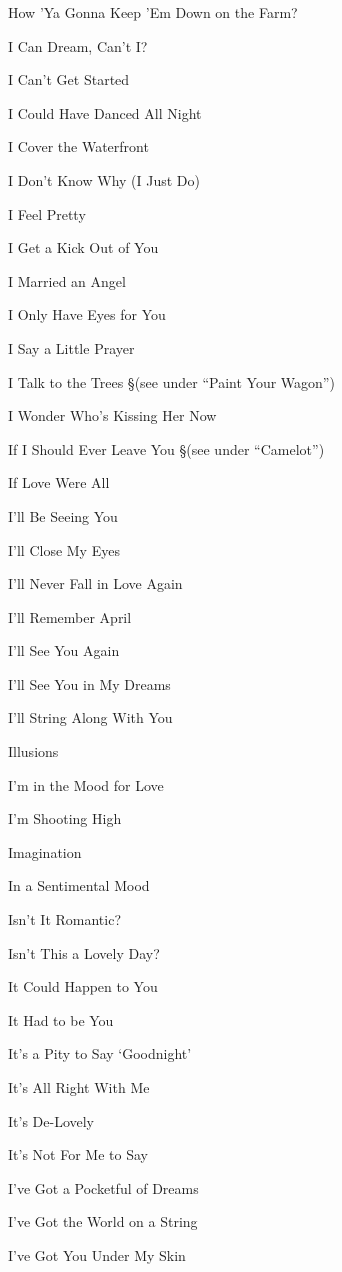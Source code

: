 \N How 'Ya Gonna Keep 'Em Down on the Farm?

\N I Can Dream, Can't I?

\N I Can't Get Started

\N I Could Have Danced All Night

\N I Cover the Waterfront

\N I Don't Know Why (I Just Do)

\N I Feel Pretty

\N I Get a Kick Out of You

\N I Married an Angel

\N I Only Have Eyes for You

\N I Say a Little Prayer

\N I Talk to the Trees
\nobreak
\S (see under ``Paint Your Wagon'')

\N I Wonder Who's Kissing Her Now

\N If I Should Ever Leave You
\nobreak
\S (see under ``Camelot'')

\N If Love Were All

\N I'll Be Seeing You

\N I'll Close My Eyes

\N I'll Never Fall in Love Again

\N I'll Remember April

\N I'll See You Again

\N I'll See You in My Dreams

\N I'll String Along With You

\N Illusions

\N I'm in the Mood for Love

\N I'm Shooting High

\N Imagination

\N In a Sentimental Mood

\N Isn't It Romantic?

\N Isn't This a Lovely Day?

\N It Could Happen to You

\N It Had to be You

\N It's a Pity to Say `Goodnight'

\N It's All Right With Me

\N It's De-Lovely

\N It's Not For Me to Say

\N I've Got a Pocketful of Dreams

\N I've Got the World on a String

\N I've Got You Under My Skin

